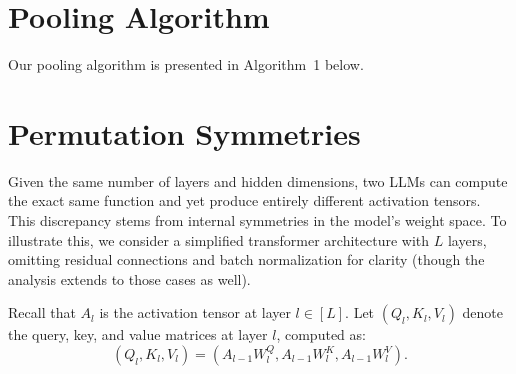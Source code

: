 \section{Pooling Algorithm}
\label{app:pool}

Our pooling algorithm is presented in Algorithm~1 below.

\begin{figure}[h]
\centering
{}
\end{figure}

\section{Permutation Symmetries}
\label{app:permutation}

Given the same number of layers and hidden dimensions, two LLMs can compute the exact same
function and yet produce entirely different activation tensors. This discrepancy stems from internal
symmetries in the model's weight space. To illustrate this, we consider a simplified transformer
architecture with $L$ layers, omitting residual connections and batch normalization for clarity (though
the analysis extends to those cases as well).

Recall that $A_l$ is the activation tensor at layer $l \in [L]$. Let $(Q_l, K_l, V_l)$ denote the query, key, and
value matrices at layer $l$, computed as:
\begin{equation}
(Q_l, K_l, V_l) = (A_{l-1} W_l^{Q}, A_{l-1} W_l^{K}, A_{l-1} W_l^{V}).
\end{equation}

